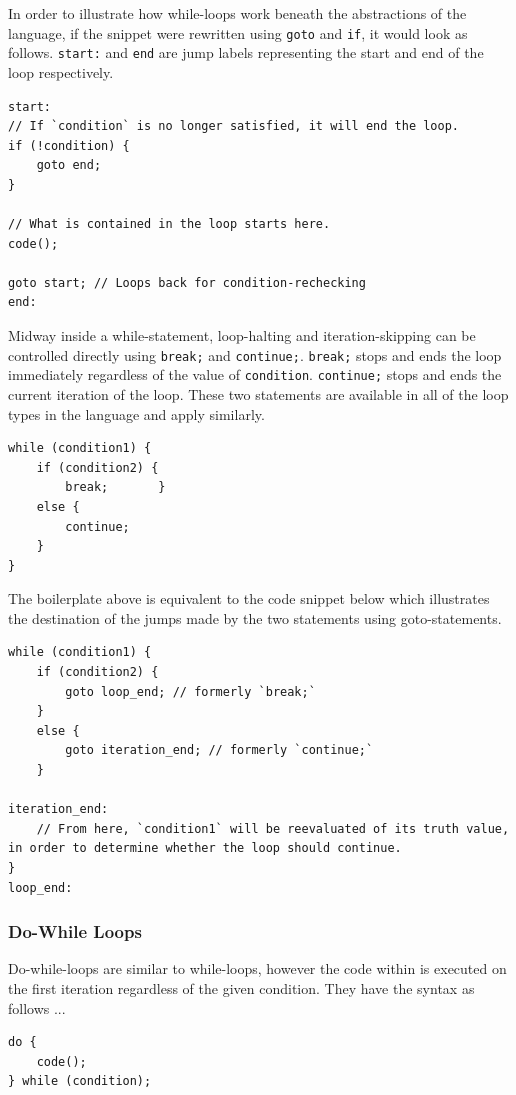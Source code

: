 \documentclass[12pt]{article}
\begin{document}
In order to illustrate how while-loops work beneath the abstractions of the language, if the snippet were rewritten using \texttt{goto} and \texttt{if}, it would look as follows. \texttt{start:} and \texttt{end} are jump labels representing the start and end of the loop respectively.

\begin{verbatim}
start:
// If `condition` is no longer satisfied, it will end the loop.
if (!condition) {
    goto end;
}

// What is contained in the loop starts here.
code();

goto start; // Loops back for condition-rechecking
end:
\end{verbatim}

Midway inside a while-statement, loop-halting and iteration-skipping can be controlled directly using \texttt{break;} and \texttt{continue;}. \texttt{break;} stops and ends the loop immediately regardless of the value of \texttt{condition}. \texttt{continue;} stops and ends the current iteration of the loop. These two statements are available in all of the loop types in the language and apply similarly.

\begin{verbatim}
while (condition1) {
    if (condition2) {
        break;       }
    else {
        continue;
    }
}
\end{verbatim}

The boilerplate above is equivalent to the code snippet below which illustrates the destination of the jumps made by the two statements using goto-statements.

\begin{verbatim}
while (condition1) {
    if (condition2) {
        goto loop_end; // formerly `break;`
    }
    else {
        goto iteration_end; // formerly `continue;`
    }

iteration_end:
    // From here, `condition1` will be reevaluated of its truth value, in order to determine whether the loop should continue.
}
loop_end:
\end{verbatim}

\subsubsection{Do-While Loops}
Do-while-loops are similar to while-loops, however the code within is executed on the first iteration regardless of the given condition. They have the syntax as follows ...

\begin{verbatim}
do {
    code();
} while (condition);
\end{verbatim}
\end{document}
